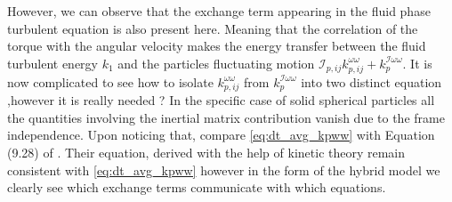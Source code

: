 However, we can observe that the exchange term appearing in the fluid phase turbulent equation is also present here. 
Meaning that the correlation of the torque with the angular velocity makes the energy transfer between the fluid turbulent energy $k_1$ and the particles fluctuating motion $\mathcal{I}_{p,ij} k^{\omega\omega}_{p,ij}+k^{\mathcal{I}\omega\omega}_{p}$. 
It is now complicated to see how to isolate $k^{\omega\omega}_{p,ij}$ from $k^{\mathcal{I}\omega\omega}_{p}$ into two distinct equation ,however it is really needed ? 
In the specific case of solid spherical particles all the quantities involving the inertial matrix contribution vanish due to the frame independence.
Upon noticing that, compare \ref{eq:dt_avg_kpww} with Equation (9.28) of \citet[Chapter 9]{rao2008introduction}. 
Their equation, derived with the help of kinetic theory remain consistent with \ref{eq:dt_avg_kpww} however in the form of the hybrid model we clearly see which exchange terms communicate with which equations. 


